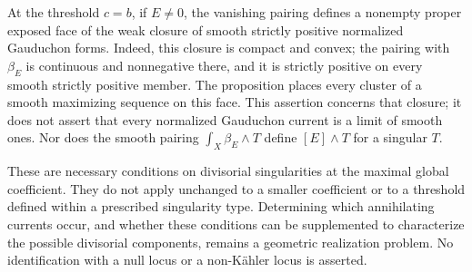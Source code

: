 At the threshold $c=b$, if $E\ne0$, the vanishing pairing defines a nonempty proper exposed face of the weak closure of smooth strictly positive normalized Gauduchon forms. Indeed, this closure is compact and convex; the pairing with $\beta_E$ is continuous and nonnegative there, and it is strictly positive on every smooth strictly positive member. The proposition places every cluster of a smooth maximizing sequence on this face. This assertion concerns that closure; it does not assert that every normalized Gauduchon current is a limit of smooth ones. Nor does the smooth pairing $\int_X\beta_E\wedge T$ define $[E]\wedge T$ for a singular $T$.

These are necessary conditions on divisorial singularities at the maximal global coefficient. They do not apply unchanged to a smaller coefficient or to a threshold defined within a prescribed singularity type. Determining which annihilating currents occur, and whether these conditions can be supplemented to characterize the possible divisorial components, remains a geometric realization problem. No identification with a null locus or a non-K\"ahler locus is asserted.
